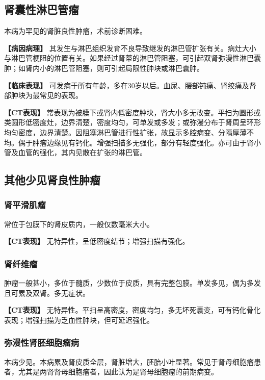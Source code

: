\subsection{肾囊性淋巴管瘤}

本病为罕见的肾脏良性肿瘤，术前诊断困难。

\textbf{【病因病理】}
其发生与淋巴组织发育不良导致继发的淋巴管扩张有关。病灶大小与淋巴管梗阻的位置有关。如果经过肾蒂的淋巴管阻塞，可引起双肾弥漫性淋巴囊肿；如肾内小的淋巴管阻塞，则可引起局限性肿块或淋巴囊肿。

\textbf{【临床表现】}
可发病于所有年龄，多在30岁以后。血尿、腰部钝痛、肾绞痛及肾部肿块为最常见的表现。

\textbf{【CT表现】}
常表现为被膜下或肾内低密度肿块，肾大小多无改变。平扫为圆形或类圆形低密度灶，边界清楚，密度均匀，可单发或多发；或弥漫分布于肾周呈环形均匀密度，边界清楚。因阻塞淋巴管进行性扩张，故显示多腔病变、分隔厚薄不均。偶于肿瘤边缘见有钙化。增强扫描多无强化，部分有轻度强化。亦可由于肾小管及血管的强化，其内见散在扩张的淋巴管。

\subsection{其他少见肾良性肿瘤}

\subsubsection{肾平滑肌瘤}

常位于包膜下的肾皮质内，一般仅数毫米大小。

\textbf{【CT表现】} 无特异性，呈低密度结节；增强扫描有强化。

\subsubsection{肾纤维瘤}

肿瘤一般甚小，多位于髓质，少数位于皮质，具有完整包膜。单发多见，偶为多发且可累及双肾。多无症状。

\textbf{【CT表现】}
无特异性。平扫呈高密度，密度均匀，多无坏死囊变，可有钙化骨化表现；增强扫描为乏血性肿块，但可延迟强化。

\subsubsection{弥漫性肾胚细胞瘤病}

本病少见。本病累及肾皮质全层，肾脏增大，胚胎小叶显著。常见于肾母细胞瘤患者，尤其是两肾肾母细胞瘤者，因此认为是肾母细胞瘤的前期病变。

